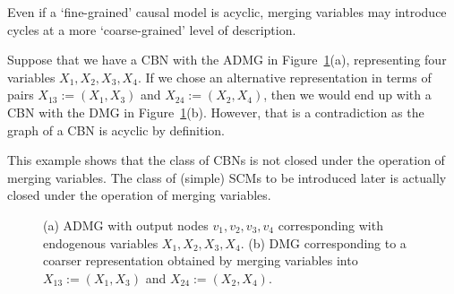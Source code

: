 Even if a `fine-grained' causal model is acyclic, merging variables may introduce cycles at a more `coarse-grained' level of description.
\begin{Eg}
Suppose that we have a CBN with the ADMG in Figure~\ref{fig:coarsening_variables_introduces_cycles}(a),
representing four variables $X_1,X_2,X_3,X_4$. If we chose an alternative representation in terms of 
pairs $X_{13}:=(X_1,X_3)$ and $X_{24}:=(X_2,X_4)$, then we would end up with a CBN with the DMG in Figure~\ref{fig:coarsening_variables_introduces_cycles}(b). However, that is a contradiction as the graph of a CBN is acyclic by definition.
\end{Eg}
This example shows that the class of CBNs is not closed under the operation of merging variables.
The class of (simple) SCMs to be introduced later is actually closed under the operation of merging variables.

\begin{figure}[tb]
\centering
{}
  \caption{(a) ADMG with output nodes $v_1, v_2, v_3, v_4$ corresponding with endogenous variables $X_1, X_2, X_3, X_4$.
  (b) DMG corresponding to a coarser representation obtained by merging variables into $X_{13} := (X_1,X_3)$ and $X_{24} := (X_2,X_4)$.
  }
\label{fig:coarsening_variables_introduces_cycles}
\end{figure}

